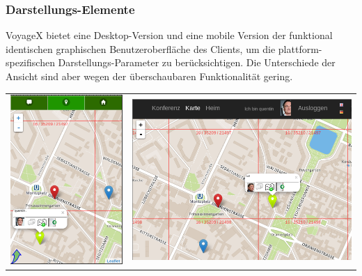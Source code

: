 \subsubsection{Darstellungs-Elemente}
VoyageX bietet eine Desktop-Version und eine mobile Version der funktional identischen graphischen Benutzeroberfläche des Clients, um die plattform-spezifischen Darstellungs-Parameter zu berücksichtigen.
Die Unterschiede  der Ansicht sind aber wegen der überschaubaren Funktionalität gering.

\begin{table}[H]
  \begin{adjustwidth}{-0.7cm}{0.7cm}
  \begin{tabulary}{\columnwidth}{ c c }
	\includegraphics[scale=0.6]{bilder/screenshots/map_mobile.png} & \includegraphics[scale=0.62]{bilder/screenshots/map_desktop.png} \\

\end{tabulary}
\end{adjustwidth}
\end{table}
